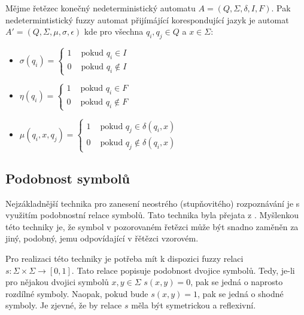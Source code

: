 \documentclass[a4paper,10pt]{article}
\begin{document}
\begin{definition} \label{def-FuzzAutBivAut}
  Mějme řetězec konečný nedeterministický automatu $A = ( Q, \Sigma, \delta, I, F )$. Pak nedetermintistický fuzzy automat přijímájící korespondující jazyk je automat $A' = ( Q, \Sigma, \mu, \sigma, \epsilon )$ kde pro všechna $q_i, q_j \in Q$ a $x \in \Sigma$:
  \begin{itemize}
   \item $\sigma(q_i) =
    \begin{cases}
     1 & \text{ pokud } q_i \in I \\
     0 & \text{ pokud } q_i \notin I
    \end{cases}$
    
   \item $\eta(q_i) =
    \begin{cases}
     1 & \text{ pokud } q_i \in F \\
     0 & \text{ pokud } q_i \notin F
    \end{cases}$
    
    \item $\mu(q_i, x, q_j) = 
     \begin{cases}
      1 & \text{ pokud } q_j \in \delta(q_i, x) \\
      0 & \text{ pokud } q_j \notin \delta(q_i, x)
     \end{cases}$
  \end{itemize}
\end{definition}



\subsection{Podobnost symbolů}
Nejzákladnější technika pro zanesení neostrého (stupňovitého) rozpoznávání je s využitím podobnostní relace symbolů. Tato technika byla přejata z \cite{RamGir-ConvFinAutFuzzAutStrComp}. Myšlenkou této techniky je, že symbol v pozorovaném řetězci může být snadno zaměněn za jiný, podobný, jemu odpovídající v řětězci vzorovém.

Pro realizaci této techniky je potřeba mít k dispozici fuzzy relaci $s: \Sigma \times \Sigma \rightarrow [0, 1]$. Tato relace popisuje podobnost dvojice symbolů. Tedy, je-li pro nějakou dvojici symbolů $x, y \in \Sigma$  $s(x, y) = 0$, pak se jedná o naprosto rozdílné symboly. Naopak, pokud bude $s(x, y) = 1$, pak se jedná o shodné symboly. Je zjevné, že by relace $s$ měla být symetrickou a reflexivní. 
\end{document}
